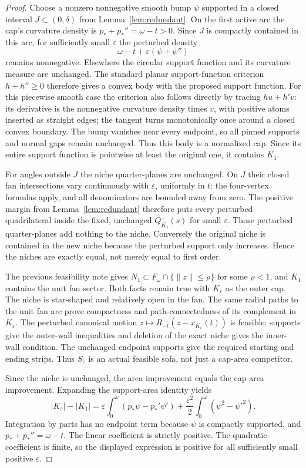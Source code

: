 \documentclass[11pt]{article}
\begin{document}
\begin{proof}
Choose a nonzero nonnegative smooth bump $\psi$ supported in a closed interval $J\subset(0,\delta)$ from Lemma~\ref{lem:redundant}. On the first active arc the cap's curvature density is $p_*+p_*''=\omega-t>0$. Since $J$ is compactly contained in this arc, for sufficiently small $\varepsilon$ the perturbed density
\[
 \omega-t+\varepsilon(\psi+\psi'')
\]
remains nonnegative. Elsewhere the circular support function and its curvature measure are unchanged. The standard planar support-function criterion $h+h''\ge0$ therefore gives a convex body with the proposed support function. For this piecewise smooth case the criterion also follows directly by tracing $h u+h'v$: its derivative is the nonnegative curvature density times $v$, with positive atoms inserted as straight edges; the tangent turns monotonically once around a closed convex boundary. The bump vanishes near every endpoint, so all pinned supports and normal gaps remain unchanged. Thus this body is a normalized cap. Since its entire support function is pointwise at least the original one, it contains $K_1$.

For angles outside $J$ the niche quarter-planes are unchanged. On $J$ their closed fan intersections vary continuously with $\varepsilon$, uniformly in $t$: the four-vertex formulas apply, and all denominators are bounded away from zero. The positive margin from Lemma~\ref{lem:redundant} therefore puts every perturbed quadrilateral inside the fixed, unchanged $Q^-_{K_1}(s)$ for small $\varepsilon$. Those perturbed quarter-planes add nothing to the niche. Conversely the original niche is contained in the new niche because the perturbed support only increases. Hence the niches are exactly equal, not merely equal to first order.

The previous feasibility note gives $N_1\subset F_\omega\cap\{\|z\|\le\rho\}$ for some $\rho<1$, and $K_1$ contains the unit fan sector. Both facts remain true with $K_\varepsilon$ as the outer cap. The niche is star-shaped and relatively open in the fan. The same radial paths to the unit fan arc prove compactness and path-connectedness of its complement in $K_\varepsilon$. The perturbed canonical motion $z\mapsto R_{-t}(z-x_{K_\varepsilon}(t))$ is feasible: supports give the outer-wall inequalities and deletion of the exact niche gives the inner-wall condition. The unchanged endpoint supports give the required starting and ending strips. Thus $S_\varepsilon$ is an actual feasible sofa, not just a cap-area competitor.

Since the niche is unchanged, the area improvement equals the cap-area improvement. Expanding the support-area identity yields
\[
 |K_\varepsilon|-|K_1|
 =\varepsilon\int_0^\omega(p_*\psi-p_*'\psi')
  +\frac{\varepsilon^2}{2}\int_0^\omega(\psi^2-\psi'^2).
\]
Integration by parts has no endpoint term because $\psi$ is compactly supported, and $p_*+p_*''=\omega-t$. The linear coefficient is strictly positive. The quadratic coefficient is finite, so the displayed expression is positive for all sufficiently small positive $\varepsilon$.
\end{proof}
\end{document}
